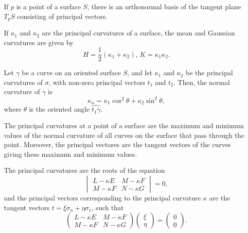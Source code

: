 \begin{corollary}
  If $p$ is a point of a surface $S$,
  there is an orthonormal basis of the tangent plane $T_p S$
  consisting of principal vectors.
\end{corollary}

\begin{proposition}
  If $\kappa_1$ and $\kappa_2$ are the principal curvatures of a surface,
  the mean and Gaussian curvatures are given by
  \[
    H = \frac{1}{2}(\kappa_1 + \kappa_2), \,
    K = \kappa_1 \kappa_2.
  \]
\end{proposition}

\begin{theorem}
  Let $\gamma$ be a curve on an oriented surface $S$,
  and let $\kappa_1$ and $\kappa_2$ be the principal curvatures of $\sigma$,
  with non-zero principal vectors $t_1$ and $t_2$.
  Then, the normal curvature of $\gamma$ is
  \[
    \kappa_n = \kappa_1 \cos^2 \theta + \kappa_2 \sin^2 \theta,  
  \]
  where $\theta$ is the oriented angle $\widehat{t_1 \dot{\gamma}}$.
\end{theorem}

\begin{corollary}
  The principal curvatures at a point of a surface are the maximum and minimum
  values of the normal curvature of all curves on the surface that pass through
  the point. Moreover, the principal vectores are the tangent vectors of the curves
  giving these maximum and minimum values.
\end{corollary}

\begin{proposition}
  The principal curvatures are the roots of the equation
  \[
    \begin{vmatrix}
      L - \kappa E & M - \kappa F \\
      M - \kappa F & N - \kappa G
    \end{vmatrix}
    = 0,
  \]
  and the principal vectors corresponding to the principal curvature $\kappa$
  are the tangent vectors $t = \xi \sigma_u + \eta \sigma_v$, such that
  \[
    \begin{pmatrix}
      L - \kappa E & M - \kappa F \\
      M - \kappa F & N - \kappa G
    \end{pmatrix}
    \begin{pmatrix}
      \xi \\
      \eta
    \end{pmatrix}
    =
    \begin{pmatrix}
      0 \\
      0
    \end{pmatrix}
    .
  \]
\end{proposition}

